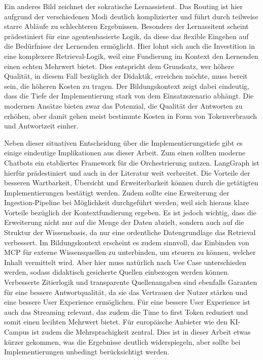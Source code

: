 Ein anderes Bild zeichnet der sokratische Lernassistent.
Das Routing ist hier aufgrund der verschiedenen Modi deutlich komplizierter und führt durch teilweise starre Abläufe zu schlechteren Ergebnissen.
Besonders der Lernassitent scheint prädestiniert für eine agentenbasierte Logik, da diese das flexible Eingehen auf die Bedürfnisse der Lernenden ermöglicht.
Hier lohnt sich auch die Investition in eine komplexere Retrieval-Logik, weil eine Fundierung im Kontext den Lernenden einen echten Mehrwert bietet.
Dies entspricht dem Grundsatz, wer höhere Qualität, in diesem Fall bezüglich der Didaktik, erreichen möchte, muss bereit sein, die höheren Kosten zu tragen.
Der Bildungskontext zeigt dabei eindeutig, dass die Tiefe der Implementierung stark von dem Einsatzszenario abhängt.
Die modernen Ansätze bieten zwar das Potenzial, die Qualität der Antworten zu erhöhen, aber damit gehen meist bestimmte Kosten in Form von Tokenverbrauch und Antwortzeit einher.

Neben dieser situativen Entscheidung über die Implementierungstiefe gibt es einige eindeutige Implikationen aus dieser Arbeit.
Zum einen sollten moderne Chatbots ein etabliertes Framework für die Orchestrierung nutzen.
LangGraph ist hierfür prädestiniert und auch in der Literatur weit verbreitet.
Die Vorteile der besseren Wartbarkeit, Übersicht und Erweiterbarkeit können durch die getätigten Implementierungen bestätigt werden.
Zudem sollte eine Erweiterung der Ingestion-Pipeline bei Möglichkeit durchgeführt werden, weil sich hieraus klare Vorteile bezüglich der Kontextfundierung ergeben.
Es ist jedoch wichtig, dass die Erweiterung nicht nur auf die Menge der Daten abzielt, sondern auch auf die Struktur der Wissensbasis, da nur eine ordentliche Datengrundlage das Retrieval verbessert.
Im Bildungskontext erscheint es zudem sinnvoll, das Einbinden von MCP für externe Wissensquellen zu unterbinden, um steuern zu können, welcher Inhalt vermittelt wird.
Aber hier muss natürlich nach Use Case unterschieden werden, sodass didaktisch gesicherte Quellen einbezogen werden können.
Verbesserte Zitierlogik und transparente Quellenangaben sind ebenfalls Garanten für eine bessere Antwortqualität, da sie das Vertrauen der Nutzer stärken und eine bessere User Experience ermöglichen.
Für eine bessere User Experience ist auch das Streaming relevant, das zudem die Time to first Token reduziert und somit einen lecihten Mehrwert bietet.
Für europäische Anbieter wie den KI-Campus ist zudem die Mehrsprachigkeit zentral.
Dies ist in dieser Arbeit etwas kürzer gekommen, was die Ergebnisse deutlich widerspiegeln, aber sollte bei Implementierungen unbedingt berücksichtigt werden.

